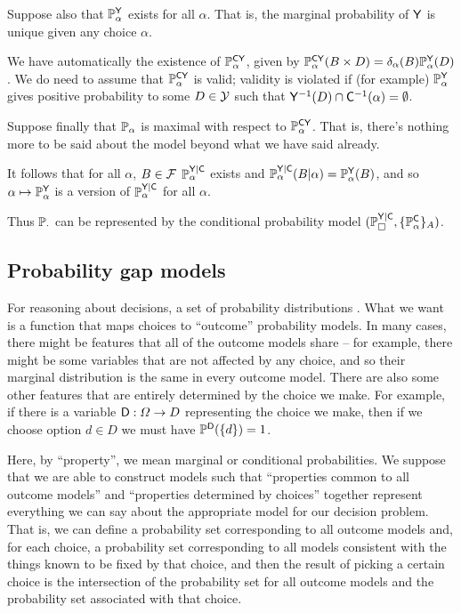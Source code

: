Suppose also that $\mathbb{P}_\alpha^{\mathsf{Y}}$ exists for all $\alpha$. That is, the marginal probability of $\mathsf{Y}$ is unique given any choice $\alpha$. 

We have automatically the existence of $\mathbb{P}_\alpha^{\mathsf{CY}}$, given by $\mathbb{P}_\alpha^{\mathsf{CY}}(B\times D)=\delta_\alpha(B)\mathbb{P}_\alpha^{\mathsf{Y}}(D)$. We do need to assume that $\mathbb{P}_\alpha^{\mathsf{CY}}$ is valid; validity is violated if (for example) $\mathbb{P}_\alpha^{\mathsf{Y}}$ gives positive probability to some $D\in \mathcal{Y}$ such that $\mathsf{Y}^{-1}(D)\cap\mathsf{C}^{-1}(\alpha)=\emptyset$.

Suppose finally that $\mathbb{P}_\alpha$ is maximal with respect to $\mathbb{P}_\alpha^{\mathsf{CY}}$. That is, there's nothing more to be said about the model beyond what we have said already.

It follows that for all $\alpha$, $B\in \mathcal{F}$ $\mathbb{P}_\alpha^{\mathsf{Y}|\mathsf{C}}$ exists and $\mathbb{P}_\alpha^{\mathsf{Y}|\mathsf{C}}(B|\alpha)=\mathbb{P}^{\mathsf{Y}}_\alpha(B)$, and so $\alpha\mapsto \mathbb{P}^{\mathsf{Y}}_\alpha$ is a version of $\mathbb{P}_\alpha^{\mathsf{Y}|\mathsf{C}}$ for all $\alpha$.

Thus $\mathbb{P}_\cdot$ can be represented by the conditional probability model $(\mathbb{P}_\square^{\mathsf{Y}|\mathsf{C}},\{\mathbb{P}^{\mathsf{C}}_\alpha\}_A)$.

\subsection{Probability gap models}

For reasoning about decisions, a set of probability distributions . What we want is a function that maps choices to ``outcome'' probability models. In many cases, there might be features that all of the outcome models share -- for example, there might be some variables that are not affected by any choice, and so their marginal distribution is the same in every outcome model. There are also some other features that are entirely determined by the choice we make. For example, if there is a variable $\mathsf{D}:\Omega\to D$ representing the choice we make, then if we choose option $d\in D$ we must have $\mathbb{P}^{\mathsf{D}}(\{d\})=1$.

Here, by ``property'', we mean marginal or conditional probabilities. We suppose that we are able to construct models such that ``properties common to all outcome models'' and ``properties determined by choices'' together represent everything we can say about the appropriate model for our decision problem. That is, we can define a probability set corresponding to all outcome models and, for each choice, a probability set corresponding to all models consistent with the things known to be fixed by that choice, and then the result of picking a certain choice is the intersection of the probability set for all outcome models and the probability set associated with that choice.

